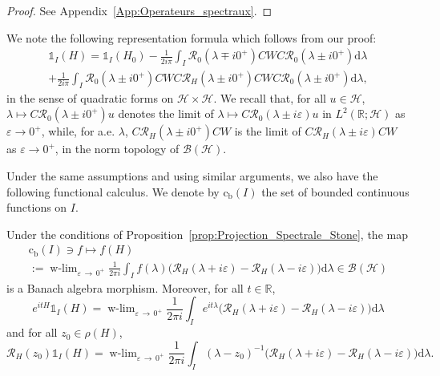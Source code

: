 \documentclass[AHL,Unicode,longabstracts,published]{cedram}
\newcommand{\Hi}{\mathcal{H}}
\newcommand{\R}{\mathbb{R}}
\newcommand{\rmc}{\mathrm{c}}
\newcommand{\rmd}{\mathrm{d}}
\newcommand{\rmb}{\mathrm{b}}
\newcommand{\Res}{\mathcal{R}}
\newcommand{\clB}{\mathcal{B}}
\DeclareMathOperator{\wlim}{w-lim}
\newcommand{\Hi}{\mathcal{H}}
\newcommand{\R}{\mathbb{R}}
\begin{document}
\begin{proof}
See Appendix~\ref{App:Operateurs_spectraux}.
\end{proof}

We note the following representation formula which follows from our proof:
\begin{multline}\label{eq:repres_1_I}
\mathds{1}_I(H) = \mathds{1}_I(H_0) - \frac{1}{2i\pi} \int_I \Res_{0}\left(\lambda\mp i0^+\right)CWC\Res_{0}\left(\lambda\pm i0^+\right) \rmd \lambda \\
+ \frac{1}{2i\pi} \int_I \Res_0\left(\lambda\pm i0^+\right) CWC\Res_H\left(\lambda\pm i0^+\right)CWC\Res_0\left(\lambda\pm i0^+\right) \rmd \lambda, 
\end{multline}
in the sense of quadratic forms on $\Hi\times\Hi$. We recall that, for all $u\in\Hi$, $\lambda\mapsto C\Res_0(\lambda\pm i0^+)u$ denotes the limit of $\lambda\mapsto C\Res_0(\lambda\pm i\varepsilon)u$ in $L^2(\R;\Hi)$ as $\varepsilon\to0^+$, while, for a.e. $\lambda$, $C\Res_H(\lambda\pm i0^+)CW$ is the limit of $C\Res_H(\lambda\pm i\varepsilon)CW$ as $\varepsilon\to0^+$, in the norm topology of $\clB(\Hi)$.


Under the same assumptions and using similar arguments, we also have the following functional calculus. We denote by $\rmc_{\rmb}(I)$ the set of bounded continuous functions on $I$.

\begin{prop}\label{prop:functional_calculus}
Under the conditions of Proposition~\ref{prop:Projection_Spectrale_Stone}, the map
\begin{multline}\label{eq:algebra_morphism}
\rmc_{\rmb}(I)\ni f\mapsto f(H)\\
:= \wlim_{\varepsilon\,\rightarrow\,0^+}\frac{1}{2\pi i}\int_If(\lambda)\big(\Res_{H}(\lambda+i\varepsilon)-\Res_{H}(\lambda-i\varepsilon)\big)\rmd \lambda\in\clB(\Hi)
\end{multline}
is a Banach algebra morphism. Moreover, for all $t\in\R$,
\begin{equation}\label{eq:Projection_spectral_calcul_fonctionnel_semi-group}
e^{itH}\mathds{1}_I(H)=\wlim_{\varepsilon\,\rightarrow\,0^+}\frac{1}{2\pi i}\int_I e^{it\lambda}\big(\Res_H(\lambda+i\varepsilon)-\Res_H(\lambda-i\varepsilon)\big)\rmd \lambda
\end{equation}
and for all $z_0\in\rho(H)$,
\begin{equation}\label{eq:Projection_spectral_calcul_fonctionnel_resolvent}
\Res_H(z_0)\mathds{1}_I(H)=\wlim_{\varepsilon\,\rightarrow\,0^+}\frac{1}{2\pi i}\int_I (\lambda-z_0)^{-1}\big(\Res_H(\lambda+i\varepsilon)-\Res_H(\lambda-i\varepsilon)\big)\rmd \lambda.
\end{equation}
\end{prop}
\end{document}
